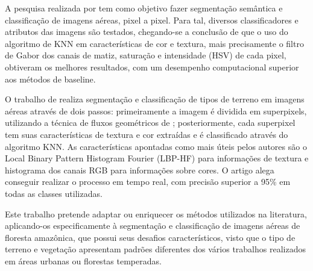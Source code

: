 A pesquisa realizada por \cite{ahmadi:2013} tem como objetivo fazer segmentação semântica e classificação de imagens aéreas, pixel a pixel. Para tal, diversos classificadores e atributos das imagens são testados, chegando-se a conclusão de que o uso do algoritmo de KNN em características de cor e textura, mais precisamente o filtro de Gabor \cite{fogel:1989} dos canais de matiz, saturação e intensidade (HSV) de cada pixel, obtiveram os melhores resultados, com um desempenho computacional superior aos métodos de baseline.

O trabalho de \cite{ghiasi:2013} realiza segmentação e classificação de tipos de terreno em imagens aéreas através de dois passos: primeiramente a imagem é dividida em superpixels, utilizando a técnica de fluxos geométricos de \cite{levinshtein:2009}; posteriormente, cada superpixel tem suas características de textura e cor extraídas e é classificado através do algoritmo KNN. As características apontadas como mais úteis pelos autores são o Local Binary Pattern Histogram Fourier (LBP-HF) \cite{ahonen:2009} para informações de textura e histograma dos canais RGB para informações sobre cores. O artigo alega conseguir realizar o processo em tempo real, com precisão superior a 95\% em todas as classes utilizadas.

Este trabalho pretende adaptar ou enriquecer os métodos utilizados na literatura, aplicando-os especificamente à segmentação e classificação de imagens aéreas de floresta amazônica, que possui seus desafios característicos, visto que o tipo de terreno e vegetação apresentam padrões diferentes dos vários trabalhos realizados em áreas urbanas ou florestas temperadas.